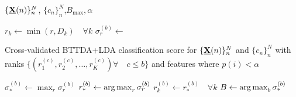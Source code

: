 \begin{algorithmic}[1]
  \Require $\{\underline{\mathbf{X}}(n)\}_n^N$, $\{c_n\}_n^N$,$B_\text{max}, \alpha$

  \State $r_k \gets \min(r, D_k) \quad \forall k$
  \State $\sigma^{(b)}_r \gets$ \parbox[t]{5cm}{Cross-validated BTTDA+LDA classification
  score for $\{\underline{\mathbf{X}}(n)\}_n^N$ and $\{c_n\}_n^N$ with ranks
  $\{(r_1^{(c)},r_2^{(c)},\ldots,r_K^{(c)}) \forall\quad
c\leq b\}$ and features where $p(i)<\alpha$}
  \EndFor
  \State $\textstyle{\sigma^{(b)}_* \gets \max_r\sigma^{(b)}_r}$
  \State $\textstyle{r^{(b)}_* \gets \operatorname*{arg\,max}_r\sigma^{(b)}_r}$
  \State $r_k^{(b)}\gets r^{(b)}_*\quad\forall k$
  \EndFor
  \State $\textstyle{B\gets\operatorname*{arg\,max}_b\sigma^{(b)}_*}$
\end{algorithmic}
